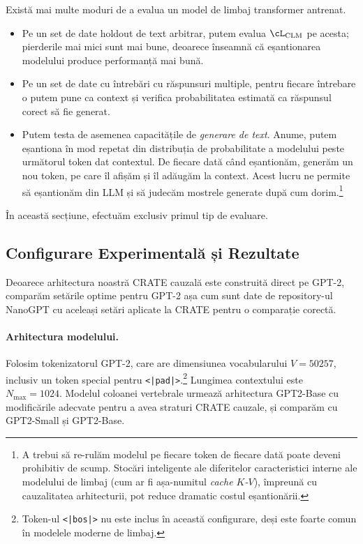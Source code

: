 \documentclass[../../book-main_ro.tex]{subfiles}
\begin{document}
Există mai multe moduri de a evalua un model de limbaj transformer antrenat.
\begin{itemize}
    \item Pe un set de date holdout de text arbitrar, putem evalua \(\cL_{\mathrm{CLM}}\) pe acesta; pierderile mai mici sunt mai bune, deoarece înseamnă că eșantionarea modelului produce performanță mai bună.
    \item Pe un set de date cu întrebări cu răspunsuri multiple, pentru fiecare întrebare o putem pune ca context și verifica probabilitatea estimată ca răspunsul corect să fie generat.
    \item Putem testa de asemenea capacitățile de \textit{generare de text}. Anume, putem eșantiona în mod repetat din distribuția de probabilitate a modelului peste următorul token dat contextul. De fiecare dată când eșantionăm, generăm un nou token, pe care îl afișăm și îl adăugăm la context. Acest lucru ne permite să eșantionăm din LLM și să judecăm mostrele generate după cum dorim.\footnote{A trebui să re-rulăm modelul pe fiecare token de fiecare dată poate deveni prohibitiv de scump. Stocări inteligente ale diferitelor caracteristici interne ale modelului de limbaj (cum ar fi așa-numitul \textit{cache \(K\)-\(V\)}), împreună cu cauzalitatea arhitecturii, pot reduce dramatic costul eșantionării.}
\end{itemize}
În această secțiune, efectuăm exclusiv primul tip de evaluare.

\subsection{Configurare Experimentală și Rezultate}

Deoarece arhitectura noastră CRATE cauzală este construită direct pe GPT-2, comparăm setările optime pentru GPT-2 așa cum sunt date de repository-ul NanoGPT \citep{nanogpt} cu aceleași setări aplicate la CRATE pentru o comparație corectă.

\paragraph{Arhitectura modelului.} Folosim tokenizatorul GPT-2, care are dimensiunea vocabularului \(V = 50257\), inclusiv un token special pentru \texttt{<|pad|>}.\footnote{Token-ul \texttt{<|bos|>} nu este inclus în această configurare, deși este foarte comun în modelele moderne de limbaj.} Lungimea contextului este \(N_{\max} = 1024\). Modelul coloanei vertebrale urmează arhitectura GPT2-Base \citep{radford2019language} cu modificările adecvate pentru a avea straturi CRATE cauzale, și comparăm cu GPT2-Small și GPT2-Base.
\end{document}
